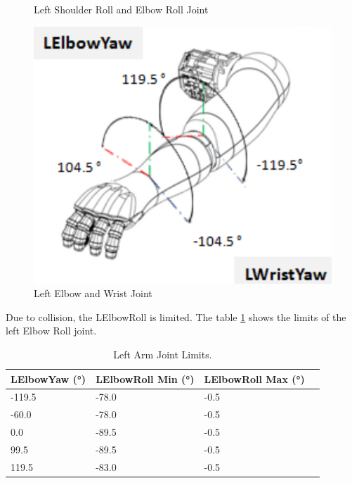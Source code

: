 \documentclass{CSSRforAfrica}
\begin{document}
\begin{figure}[!hbpt]
\begin{minipage}{0.45\textwidth}
        \caption{Left Shoulder Roll and Elbow Roll Joint \cite{PepperJoints}}
        \label{fig: Left Shoulder Roll and Elbow Roll joint}
    \end{minipage}\hfill
    \begin{minipage}{0.45\textwidth}
        \centering
        \includegraphics[scale=0.45]{images/LElbowandWristYaw.png}
        \caption{Left Elbow and Wrist Joint \cite{PepperJoints}}
        \label{fig: Left Elbow and Wrist joint}
    \end{minipage}
\end{figure}

\newpage

Due to collision, the LElbowRoll is limited. The table \ref{tab:left_arm_joint_limits} shows the limits of the 
left Elbow Roll joint.

\begin{longtable}[c]{|l|l|l|l|} 
    \caption{Left Arm Joint Limits.\cite{PepperJoints}} \label{tab:left_arm_joint_limits}\\
    \hline
    \rowcolor{gray!30}
    \textbf{LElbowYaw (°)} & \textbf{LElbowRoll Min (°)} & \textbf{LElbowRoll Max (°)} \\ \hline
    \endhead %
    
    -119.5 & -78.0 & -0.5 \\ \hline
    -60.0 & -78.0 & -0.5 \\ \hline
    0.0 & -89.5 & -0.5 \\ \hline
    99.5 & -89.5 & -0.5 \\ \hline
    119.5 & -83.0 & -0.5 \\ \hline

\end{longtable}
\end{document}
